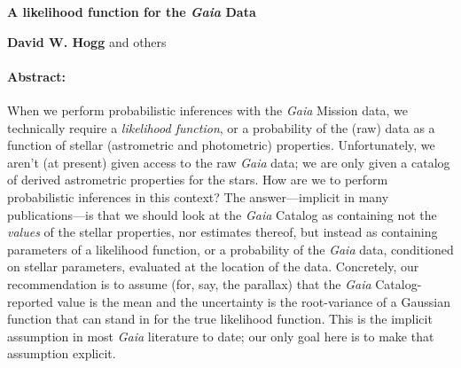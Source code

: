 \documentclass[12pt]{article}
\begin{document}
\noindent
\textbf{A likelihood function for the \textsl{Gaia} Data}

\noindent
\textbf{David W. Hogg} and others

\paragraph{Abstract:}
When we perform probabilistic inferences with the \textsl{Gaia} Mission data,
we technically require
a \emph{likelihood function}, or a probability of the (raw) data as a function
of stellar (astrometric and photometric) properties.
Unfortunately, we aren't (at present) given access to the raw \textsl{Gaia}
data; we are only given a catalog of derived astrometric properties for the stars.
How are we to perform probabilistic inferences in this context?
The answer---implicit in many publications---is that we should look at the
\textsl{Gaia} Catalog as containing not the \emph{values} of the stellar properties,
nor estimates thereof, but instead as containing parameters of a likelihood function, or
a probability of the \textsl{Gaia} data, conditioned on stellar parameters,
evaluated at the location of the data.
Concretely, our recommendation is to assume
(for, say, the parallax) that the \textsl{Gaia} Catalog-reported
value is the mean and the uncertainty is the root-variance of a Gaussian
function that can stand in for the true likelihood function.
This is the implicit assumption in most \textsl{Gaia} literature to date;
our only goal here is to make that assumption explicit.
\end{document}
